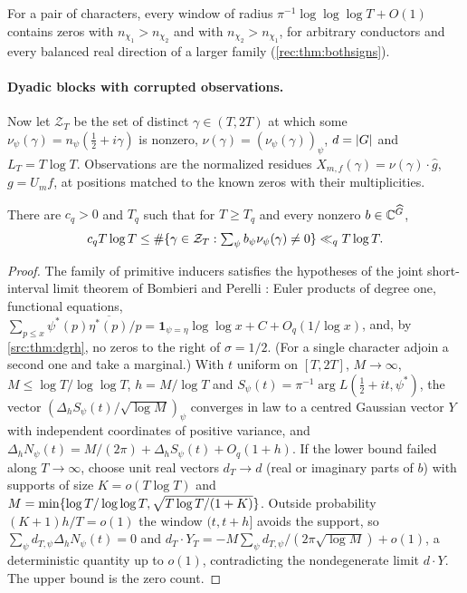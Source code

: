 For a pair of characters, every window of radius $\pi^{-1}\log\log\log T+O(1)$ contains zeros with
$n_{\chi_1}>n_{\chi_2}$ and with $n_{\chi_2}>n_{\chi_1}$, for arbitrary conductors and every balanced real
direction of a larger family (\cref{rec:thm:bothsigns}).

\paragraph{Dyadic blocks with corrupted observations.}
Now let $\mathcal Z_T$ be the set of distinct $\gamma\in(T,2T)$ at which some $\nu_\psi(\gamma)=n_\psi(\tfrac12+i\gamma)$
is nonzero, $\nu(\gamma)=(\nu_\psi(\gamma))_\psi$, $d=\lvert G\rvert$ and $L_T=T\log T$. Observations are
the normalized residues $X_{m,f}(\gamma)=\nu(\gamma)\cdot\widehat g$, $g=U_mf$, at positions matched to
the known zeros with their multiplicities.

\begin{theorem}\label{rec:thm:distinct}
There are $c_q>0$ and $T_q$ such that for $T\ge T_q$ and every nonzero $b\in\mathbb{C}^{\widehat G}$,
\[
 c_qT\log T\le\#\{\gamma\in\mathcal Z_T:\textstyle\sum_\psi b_\psi\nu_\psi(\gamma)\ne0\}\ll_qT\log T .
\]
\end{theorem}

\begin{proof}
The family of primitive inducers satisfies the hypotheses of the joint short-interval limit theorem
of Bombieri and Perelli \cite[Theorem~2]{BombieriPerelli1998Distinct}: Euler products of degree one,
functional equations, $\sum_{p\le x}\psi^*(p)\overline{\eta^*(p)}/p=\mathbf 1_{\psi=\eta}\log\log x+C+O_q(1/\log x)$,
and, by \cref{src:thm:dgrh}, no zeros to the right of $\sigma=1/2$. (For a single character adjoin a
second one and take a marginal.) With $t$ uniform on $[T,2T]$, $M\to\infty$,
$M\le\log T/\log\log T$, $h=M/\log T$ and $S_\psi(t)=\pi^{-1}\arg L(\tfrac12+it,\psi^*)$, the vector
$(\Delta_hS_\psi(t)/\sqrt{\log M})_\psi$ converges in law to a centred Gaussian vector $Y$ with
independent coordinates of positive variance, and $\Delta_hN_\psi(t)=M/(2\pi)+\Delta_hS_\psi(t)+O_q(1+h)$.
If the lower bound failed along $T\to\infty$, choose unit real vectors $d_T\to d$ (real or imaginary
parts of $b$) with supports of size $K=o(T\log T)$ and
$M=\min\{\log T/\log\log T,\sqrt{T\log T/(1+K)}\}$. Outside probability $(K+1)h/T=o(1)$ the window
$(t,t+h]$ avoids the support, so $\sum_\psi d_{T,\psi}\Delta_hN_\psi(t)=0$ and
$d_T\cdot Y_T=-M\sum_\psi d_{T,\psi}/(2\pi\sqrt{\log M})+o(1)$, a deterministic quantity up to $o(1)$,
contradicting the nondegenerate limit $d\cdot Y$. The upper bound is the zero count.
\end{proof}

